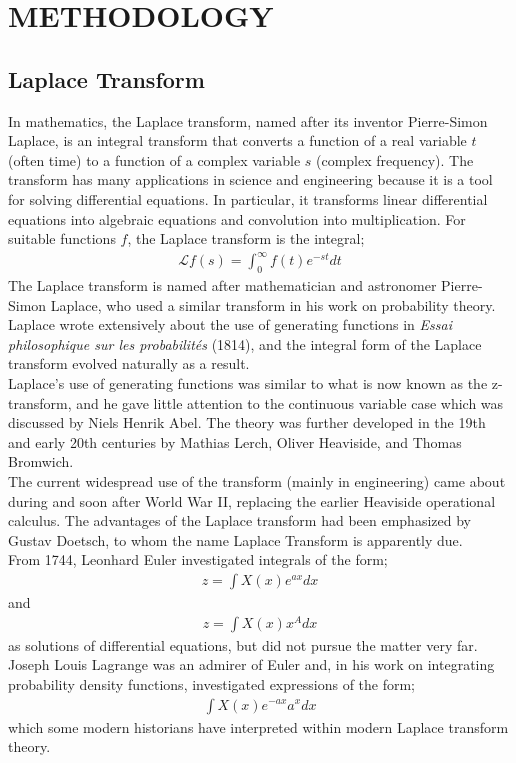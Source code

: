 \documentclass[11pt]{report}
\newcommand{\Laplace}{\mathcal{L}}
\newcommand{\NI}{\noindent}
\begin{document}
	\chapter{METHODOLOGY}
	\section{Laplace Transform}
	In mathematics, the Laplace transform, named after its inventor Pierre-Simon Laplace, is an integral transform that converts a function of a real variable $t$ (often time) to a function of a complex variable $s$ (complex frequency). The transform has many applications in science and engineering because it is a tool for solving differential equations. In particular, it transforms linear differential equations into algebraic equations and convolution into multiplication. For suitable functions $f$, the Laplace transform is the integral;
	\begin{eqnarray}
		\Laplace{f}(s) = \int_{0}^{\infty} f(t) e^{-st} dt
	\end{eqnarray}
	The Laplace transform is named after mathematician and astronomer Pierre-Simon Laplace, who used a similar transform in his work on probability theory. Laplace wrote extensively about the use of generating functions in \emph{Essai philosophique sur les probabilités} (1814), and the integral form of the Laplace transform evolved naturally as a result.\\
	
	\NI Laplace's use of generating functions was similar to what is now known as the z-transform, and he gave little attention to the continuous variable case which was discussed by Niels Henrik Abel. The theory was further developed in the 19th and early 20th centuries by Mathias Lerch, Oliver Heaviside, and Thomas Bromwich.\\
	
	\NI The current widespread use of the transform (mainly in engineering) came about during and soon after World War II, replacing the earlier Heaviside operational calculus. The advantages of the Laplace transform had been emphasized by Gustav Doetsch, to whom the name Laplace Transform is apparently due.\\
	
	\NI	From 1744, Leonhard Euler investigated integrals of the form;\\
	\begin{eqnarray}
		z =\int X(x) e^{ax} dx
	\end{eqnarray}
	and
	\begin{eqnarray}
		z =\int X(x)x^A dx
	\end{eqnarray}
	as solutions of differential equations, but did not pursue the matter very far. Joseph Louis Lagrange was an admirer of Euler and, in his work on integrating probability density functions, investigated expressions of the form;
	\begin{eqnarray}
		\int X(x) e^{-ax} a^x dx
	\end{eqnarray}
	which some modern historians have interpreted within modern Laplace transform theory.\\
	
\end{document}
